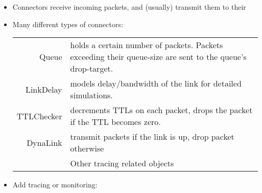 \documentclass[landscape]{foils}
\begin{document}
\begin{comment}
\item The install procedures overload instproc-likes to return nice
key-value paris that can be loaded into Tcl arrays directly.
\item The classify is internal nad different from the rest.
\item classify is not used by Multipath or replicators
\end{comment}



\begin{comment}
  \item 
\end{comment}
\begin{itemize}
\item Connectors receive incoming packets, and (usually) transmit them
  to their 
\item Many different types of connectors:

  {\footnotesize
  \begin{tabularx}{\linewidth}{rX}
    Queue & holds a certain number of packets.
    Packets exceeding their queue-size are sent to the queue's drop-target.\\
    LinkDelay &  models delay/bandwidth of the link for detailed simulations.\\
    TTLChecker &  decrements TTLs on each packet,
                        drops the packet if the TTL becomes zero.\\
    DynaLink & transmit packets if the link is up, drop packet otherwise\\
       & Other tracing related objects\\
  \end{tabularx}}
\end{itemize}

\begin{comment}
  \item N way in, one way out.
  \item Multiple trace data, and hecne sleep overnight.
\end{comment}

\begin{itemize}
\item Add tracing or monitoring:
\end{itemize}
\end{document}

